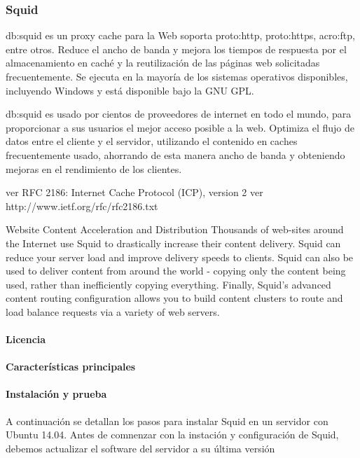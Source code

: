 \subsubsection{Squid}
\label{soa:tecnologias:squid}

\gls{db:squid} es un proxy cache para la Web soporta \gls{proto:http}, \gls{proto:https}, \gls{acro:ftp}, entre otros. Reduce el ancho de banda y mejora los tiempos de respuesta por el almacenamiento en caché y la reutilización de las páginas web solicitadas frecuentemente.  Se ejecuta en la mayoría de los sistemas operativos disponibles, incluyendo Windows y está disponible bajo la GNU GPL.

\gls{db:squid} es usado por cientos de proveedores de internet en todo el mundo, para proporcionar a sus usuarios el mejor acceso posible a la web.  Optimiza el flujo de datos entre el cliente y el servidor, utilizando el contenido en caches frecuentemente usado, ahorrando de esta manera ancho de banda y obteniendo mejoras en el rendimiento de los clientes.

ver RFC 2186: Internet Cache Protocol (ICP), version 2
ver http://www.ietf.org/rfc/rfc2186.txt

Website Content Acceleration and Distribution
Thousands of web-sites around the Internet use Squid to drastically increase their content delivery. Squid can reduce your server load and improve delivery speeds to clients. Squid can also be used to deliver content from around the world - copying only the content being used, rather than inefficiently copying everything. Finally, Squid's advanced content routing configuration allows you to build content clusters to route and load balance requests via a variety of web servers.

\paragraph{Licencia}

\paragraph{Características principales}

\paragraph{Instalación y prueba}

A continuación se detallan los pasos para instalar Squid en un servidor con Ubuntu 14.04.  Antes de comnenzar con la instación y configuración de Squid, debemos actualizar el software del servidor a su última versión

